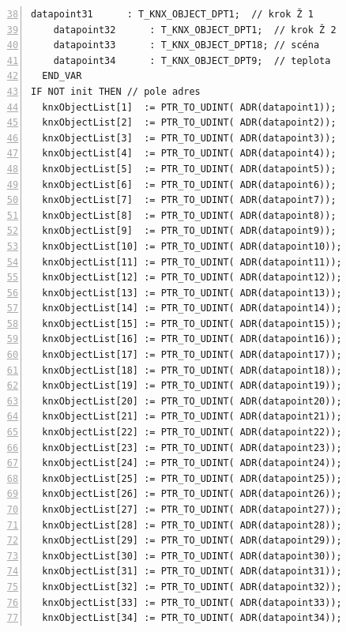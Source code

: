 \begin{lstlisting}[language=ST, breaklines=true, numbers=left, firstnumber=38, numberstyle=\small, numbersep=10pt, frame=single, basicstyle=\ttfamily\small]
    datapoint31      : T_KNX_OBJECT_DPT1;  // krok Ž 1
    datapoint32      : T_KNX_OBJECT_DPT1;  // krok Ž 2
    datapoint33      : T_KNX_OBJECT_DPT18; // scéna
    datapoint34      : T_KNX_OBJECT_DPT9;  // teplota
  END_VAR
IF NOT init THEN // pole adres
  knxObjectList[1]  := PTR_TO_UDINT( ADR(datapoint1));   
  knxObjectList[2]  := PTR_TO_UDINT( ADR(datapoint2));   
  knxObjectList[3]  := PTR_TO_UDINT( ADR(datapoint3));   
  knxObjectList[4]  := PTR_TO_UDINT( ADR(datapoint4));   
  knxObjectList[5]  := PTR_TO_UDINT( ADR(datapoint5));   
  knxObjectList[6]  := PTR_TO_UDINT( ADR(datapoint6));   
  knxObjectList[7]  := PTR_TO_UDINT( ADR(datapoint7));   
  knxObjectList[8]  := PTR_TO_UDINT( ADR(datapoint8));   
  knxObjectList[9]  := PTR_TO_UDINT( ADR(datapoint9));   
  knxObjectList[10] := PTR_TO_UDINT( ADR(datapoint10));  
  knxObjectList[11] := PTR_TO_UDINT( ADR(datapoint11));  
  knxObjectList[12] := PTR_TO_UDINT( ADR(datapoint12));  
  knxObjectList[13] := PTR_TO_UDINT( ADR(datapoint13));  
  knxObjectList[14] := PTR_TO_UDINT( ADR(datapoint14));  
  knxObjectList[15] := PTR_TO_UDINT( ADR(datapoint15));  
  knxObjectList[16] := PTR_TO_UDINT( ADR(datapoint16));  
  knxObjectList[17] := PTR_TO_UDINT( ADR(datapoint17));  
  knxObjectList[18] := PTR_TO_UDINT( ADR(datapoint18));  
  knxObjectList[19] := PTR_TO_UDINT( ADR(datapoint19));  
  knxObjectList[20] := PTR_TO_UDINT( ADR(datapoint20));  
  knxObjectList[21] := PTR_TO_UDINT( ADR(datapoint21));  
  knxObjectList[22] := PTR_TO_UDINT( ADR(datapoint22));  
  knxObjectList[23] := PTR_TO_UDINT( ADR(datapoint23));  
  knxObjectList[24] := PTR_TO_UDINT( ADR(datapoint24));  
  knxObjectList[25] := PTR_TO_UDINT( ADR(datapoint25));  
  knxObjectList[26] := PTR_TO_UDINT( ADR(datapoint26));  
  knxObjectList[27] := PTR_TO_UDINT( ADR(datapoint27));  
  knxObjectList[28] := PTR_TO_UDINT( ADR(datapoint28));  
  knxObjectList[29] := PTR_TO_UDINT( ADR(datapoint29));  
  knxObjectList[30] := PTR_TO_UDINT( ADR(datapoint30));    
  knxObjectList[31] := PTR_TO_UDINT( ADR(datapoint31));
  knxObjectList[32] := PTR_TO_UDINT( ADR(datapoint32));  
  knxObjectList[33] := PTR_TO_UDINT( ADR(datapoint33));    
  knxObjectList[34] := PTR_TO_UDINT( ADR(datapoint34));
\end{lstlisting}
\pagebreak
